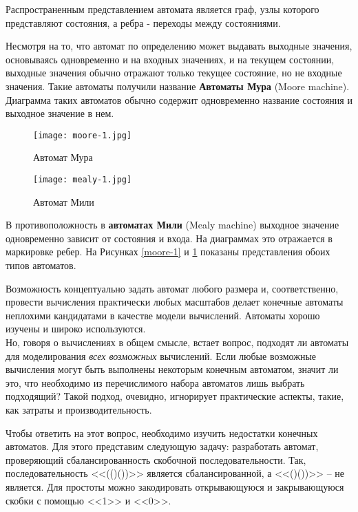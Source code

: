 \documentclass[a4paper,14pt]{extreport} %
\begin{document}
Распространенным представлением автомата является граф, узлы которого представляют состояния, а ребра - переходы между состояниями.

Несмотря на то, что автомат по определению  может выдавать выходные значения, основываясь одновременно и на входных значениях, и на текущем состоянии, выходные значения  обычно отражают только текущее состояние, но не входные значения. Такие автоматы получили название \textbf{Автоматы Мура} (Moore machine). Диаграмма таких автоматов обычно содержит одновременно название состояния и выходное значение в нем.

\begin{figure}[!tbp]
  \centering
  \begin{minipage}[b]{0.55\textwidth}
    \texttt{[image: moore-1.jpg]}
    \caption{Автомат Мура}
    \label{moore-1}
  \end{minipage}
  \hfill
  \begin{minipage}[b]{0.41\textwidth}
    \texttt{[image: mealy-1.jpg]}
    \caption{Автомат Мили}
    \label{mealy-1}
  \end{minipage}
\end{figure}

В противоположность в \textbf{автоматах Мили} (Mealy machine) выходное значение одновременно зависит от состояния и входа. На диаграммах это отражается в маркировке ребер. На Рисунках \ref{moore-1} и \ref{mealy-1} показаны представления обоих типов автоматов.

Возможность концептуально задать автомат любого размера и, соответственно, провести вычисления практически любых масштабов делает конечные автоматы неплохими кандидатами в качестве модели вычислений. Автоматы хорошо изучены и широко используются. \\


Но, говоря о вычислениях в общем смысле, встает вопрос, подходят ли автоматы для моделирования  \textit{всех возможных} вычислений. Если любые возможные вычисления могут быть выполнены некоторым конечным автоматом, значит ли это, что необходимо из перечислимого набора автоматов лишь  выбрать подходящий? Такой подход, очевидно, игнорирует практические аспекты, такие, как затраты и производительность.

Чтобы ответить на этот вопрос, необходимо изучить недостатки конечных автоматов. Для этого представим следующую задачу: разработать автомат, проверяющий сбалансированность скобочной последовательности. Так, последовательность <<(()())>> является сбалансированной, а <<()())>> -- не является. Для простоты можно закодировать открывающуюся и закрывающуюся скобки с помощью <<1>> и <<0>>.
\end{document}
